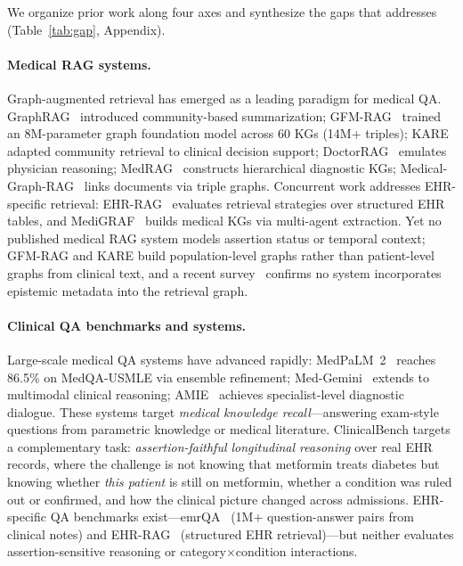 
We organize prior work along four axes and synthesize the gaps that \epikg addresses (Table~\ref{tab:gap}, Appendix).

\paragraph{Medical RAG systems.}
Graph-augmented retrieval has emerged as a leading paradigm for medical QA.
GraphRAG~\cite{edge2024graphrag} introduced community-based summarization; GFM-RAG~\cite{luo2025gfmrag} trained an 8M-parameter graph foundation model across 60 KGs (14M+ triples); KARE~\cite{jiang2025kare} adapted community retrieval to clinical decision support; DoctorRAG~\cite{lu2025doctorrag} emulates physician reasoning; MedRAG~\cite{wang2025medrag} constructs hierarchical diagnostic KGs; Medical-Graph-RAG~\cite{wu2025medicalgraphrag} links documents via triple graphs.
Concurrent work addresses EHR-specific retrieval: EHR-RAG~\cite{cao2026ehrrag} evaluates retrieval strategies over structured EHR tables, and MediGRAF~\cite{thio2025medigraf} builds medical KGs via multi-agent extraction.
Yet no published medical RAG system models assertion status or temporal context; GFM-RAG and KARE build population-level graphs rather than patient-level graphs from clinical text, and a recent survey~\cite{graphragsurvey2025} confirms no system incorporates epistemic metadata into the retrieval graph.

\paragraph{Clinical QA benchmarks and systems.}
Large-scale medical QA systems have advanced rapidly: MedPaLM~2~\cite{singhal2023medpalm2} reaches 86.5\% on MedQA-USMLE via ensemble refinement; Med-Gemini~\cite{saab2024medgemini} extends to multimodal clinical reasoning; AMIE~\cite{tu2024amie} achieves specialist-level diagnostic dialogue.
These systems target \emph{medical knowledge recall}---answering exam-style questions from parametric knowledge or medical literature.
ClinicalBench targets a complementary task: \emph{assertion-faithful longitudinal reasoning} over real EHR records, where the challenge is not knowing that metformin treats diabetes but knowing whether \emph{this patient} is still on metformin, whether a condition was ruled out or confirmed, and how the clinical picture changed across admissions.
EHR-specific QA benchmarks exist---emrQA~\cite{pampari2018emrqa} (1M+ question-answer pairs from clinical notes) and EHR-RAG~\cite{cao2026ehrrag} (structured EHR retrieval)---but neither evaluates assertion-sensitive reasoning or category$\times$condition interactions.

